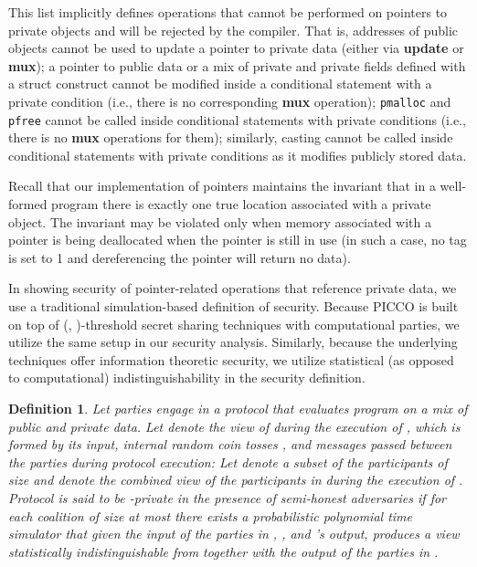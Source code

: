\documentclass[11pt]{article}
\newtheorem{definition}{Definition}
\begin{document}
This list implicitly defines operations that cannot be performed on pointers
to private objects and will be rejected by the compiler. That is, addresses
of public objects cannot be used to update a pointer to private data (either
via \textbf{update} or \textbf{mux}); a pointer to public data or a mix of
private and private fields defined with a struct construct cannot be
modified inside a conditional statement with a private condition (i.e.,
there is no corresponding \textbf{mux} operation); \texttt{pmalloc} and
\texttt{pfree} cannot be called inside conditional statements with private
conditions (i.e., there is no \textbf{mux} operations for them); similarly,
casting cannot be called inside conditional statements with private
conditions as it modifies publicly stored data.

Recall that our implementation of pointers maintains the invariant that in a
well-formed program there is exactly one true location associated with a
private object. The invariant may be violated only when memory associated
with a pointer is being deallocated when the pointer is still in use (in
such a case, no tag is set to 1 and dereferencing the pointer will return no
data).

In showing security of pointer-related operations that reference private
data, we use a traditional simulation-based definition of security. Because
PICCO is built on top of (, )-threshold secret sharing techniques with
 computational parties, we utilize the same setup in our security
analysis. Similarly, because the underlying techniques offer information
theoretic security, we utilize statistical (as opposed to computational)
indistinguishability in the security definition.  

\begin{definition}
Let parties  engage in a protocol  that evaluates
program  on a mix of public and private data. Let
 denote the view of  during the execution of
, which is formed by its input, internal random coin tosses , and
messages  passed between the parties during protocol
execution:  Let
 denote a subset of the participants of size  and
 denote the combined view of the participants in 
during the execution of . Protocol  is said to be -private in
the presence of semi-honest adversaries if for each coalition of size at
most  there exists a probabilistic polynomial time simulator 
that given the input of the parties in , , and 's output, produces
a view statistically indistinguishable from  together
with the output of the parties in .
\end{definition}
\end{document}
